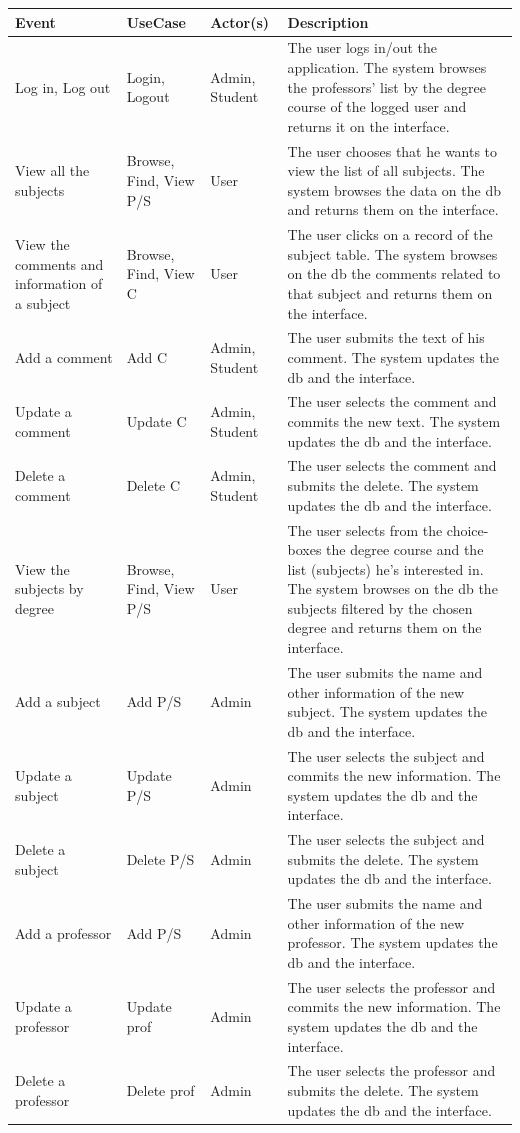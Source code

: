 \documentclass[a4paper]{article}
\begin{document}
\begin{table}[h]
\centering
\begin{tabular}{p{}p{}lp{}}
\hline
\textbf{Event} & \textbf{UseCase} & \textbf{Actor(s)} & \textbf{Description}\\ \hline
Log in, Log out & Login,  Logout & Admin, Student & The user logs in/out the application. The system browses the professors' list by the degree course of the logged user and returns it on the interface.\\ \hline
View all the subjects & Browse, Find, View P/S & User & The user chooses that he wants to view the list of all subjects. The system browses the data on the db and returns them on the interface.\\ \hline
View the comments and information of a subject & Browse, Find, View C & User & The user clicks on a record of the subject table. The system browses on the db the comments related to that subject and returns them on the interface.\\ \hline
Add a comment & Add C & Admin, Student & The user submits the text of his comment. The system updates the db and the interface.\\ \hline
Update a comment & Update C & Admin, Student & The user selects the comment and commits the new text. The system updates the db and the interface.\\ \hline
Delete a comment & Delete C & Admin, Student & The user selects the comment and submits the delete. The system updates the db and the interface.\\ \hline
View the subjects by degree & Browse, Find, View P/S & User & The user selects from the choice-boxes the degree course and the list (subjects) he's interested in. The system browses on the db the subjects filtered by the chosen degree and returns them on the interface.\\ \hline
Add a subject & Add P/S & Admin & The user submits the name and other information of the new subject. The system updates the db and the interface.\\ \hline
Update a subject & Update P/S & Admin & The user selects the subject and commits the new information. The system updates the db and the interface.\\ \hline
Delete a subject & Delete P/S & Admin & The user selects the subject and submits the delete. The system updates the db and the interface.\\ \hline
Add a professor & Add P/S & Admin & The user submits the name and other information of the new professor. The system updates the db and the interface.\\ \hline
Update a professor & Update prof & Admin & The user selects the professor and commits the new information. The system updates the db and the interface.\\ \hline
Delete a professor & Delete prof & Admin & The user selects the professor and submits the delete. The system updates the db and the interface.\\ \hline
\end{tabular}
\end{table}
\end{document}
